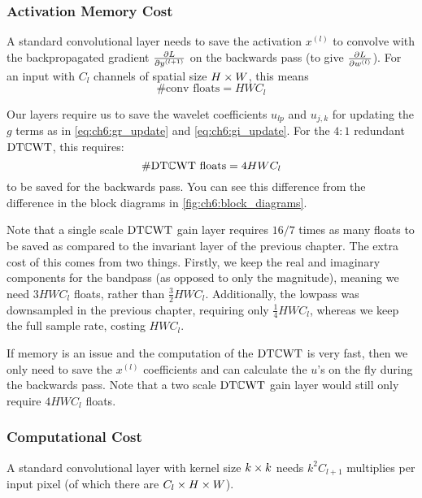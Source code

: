 \subsubsection{Activation Memory Cost}\label{sec:ch6:act_memory}
A standard convolutional layer needs to save the activation $x^{(l)}$ to
convolve with the backpropagated gradient $\frac{\partial L}{\partial y^{(l+1)}}$ on the backwards
pass (to give $\frac{\partial L}{\partial w^{(l)}}$). For an input with $C_l$ channels of spatial
size $H\times W$, this means
%
\begin{equation}
  \text{\#conv floats} = HWC_l 
\end{equation}

Our layers require us to save the wavelet coefficients $u_{lp}$ and $u_{j,k}$
for updating the $g$ terms as in \eqref{eq:ch6:gr_update} and \eqref{eq:ch6:gi_update}.  
For the $4:1$ redundant $\mathrm{DT}\mathbb{C}\mathrm{WT}$, this requires:
%
\begin{equation}
  \text{\#$\mathrm{DT}\mathbb{C}\mathrm{WT}$ floats} = 4HWC_l 
\end{equation}
%
to be saved for the backwards pass.  You can see this difference from the
difference in the block diagrams in \autoref{fig:ch6:block_diagrams}.

Note that a single scale $\mathrm{DT}\mathbb{C}\mathrm{WT}$ gain layer requires $16/7$ times as many
floats to be saved as compared to the invariant layer of the previous chapter.
The extra cost of this comes from two things. Firstly, we keep the real and
imaginary components for the bandpass (as opposed to only the magnitude),
meaning we need $3HWC_l$ floats, rather than $\frac{3}{2}HWC_l$. Additionally,
the lowpass was downsampled in the previous chapter, requiring only
$\frac{1}{4}HWC_l$, whereas we keep the full sample rate, costing $HWC_l$.

If memory is an issue and the computation of the $\mathrm{DT}\mathbb{C}\mathrm{WT}$ is very fast, then we
only need to save the $x^{(l)}$ coefficients and can calculate the $u$'s on the
fly during the backwards pass. Note that a two scale $\mathrm{DT}\mathbb{C}\mathrm{WT}$ gain layer would
still only require $4HWC_l$ floats.

\subsubsection{Computational Cost}\label{sec:ch6:computation}
A standard convolutional layer with kernel size $k\times k$ needs $k^2C_{l+1}$
multiplies per input pixel (of which there are $C_{l}\times H\times W$).

